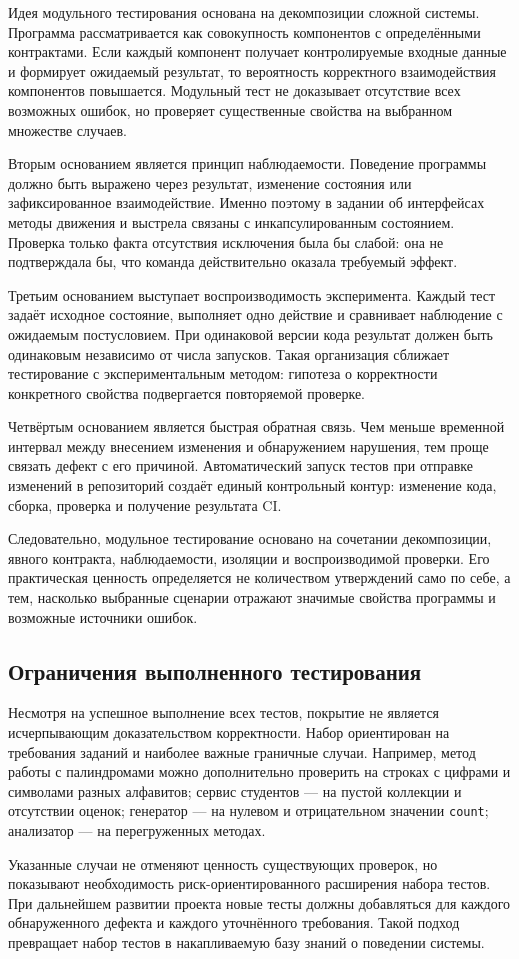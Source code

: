 Идея модульного тестирования основана на декомпозиции сложной системы. Программа рассматривается как совокупность компонентов с определёнными контрактами. Если каждый компонент получает контролируемые входные данные и формирует ожидаемый результат, то вероятность корректного взаимодействия компонентов повышается. Модульный тест не доказывает отсутствие всех возможных ошибок, но проверяет существенные свойства на выбранном множестве случаев.

Вторым основанием является принцип наблюдаемости. Поведение программы должно быть выражено через результат, изменение состояния или зафиксированное взаимодействие. Именно поэтому в задании об интерфейсах методы движения и выстрела связаны с инкапсулированным состоянием. Проверка только факта отсутствия исключения была бы слабой: она не подтверждала бы, что команда действительно оказала требуемый эффект.

Третьим основанием выступает воспроизводимость эксперимента. Каждый тест задаёт исходное состояние, выполняет одно действие и сравнивает наблюдение с ожидаемым постусловием. При одинаковой версии кода результат должен быть одинаковым независимо от числа запусков. Такая организация сближает тестирование с экспериментальным методом: гипотеза о корректности конкретного свойства подвергается повторяемой проверке.

Четвёртым основанием является быстрая обратная связь. Чем меньше временной интервал между внесением изменения и обнаружением нарушения, тем проще связать дефект с его причиной. Автоматический запуск тестов при отправке изменений в репозиторий создаёт единый контрольный контур: изменение кода, сборка, проверка и получение результата CI.

Следовательно, модульное тестирование основано на сочетании декомпозиции, явного контракта, наблюдаемости, изоляции и воспроизводимой проверки. Его практическая ценность определяется не количеством утверждений само по себе, а тем, насколько выбранные сценарии отражают значимые свойства программы и возможные источники ошибок.

\subsection{Ограничения выполненного тестирования}

Несмотря на успешное выполнение всех тестов, покрытие не является исчерпывающим доказательством корректности. Набор ориентирован на требования заданий и наиболее важные граничные случаи. Например, метод работы с палиндромами можно дополнительно проверить на строках с цифрами и символами разных алфавитов; сервис студентов --- на пустой коллекции и отсутствии оценок; генератор --- на нулевом и отрицательном значении \texttt{count}; анализатор --- на перегруженных методах.

Указанные случаи не отменяют ценность существующих проверок, но показывают необходимость риск-ориентированного расширения набора тестов. При дальнейшем развитии проекта новые тесты должны добавляться для каждого обнаруженного дефекта и каждого уточнённого требования. Такой подход превращает набор тестов в накапливаемую базу знаний о поведении системы.
